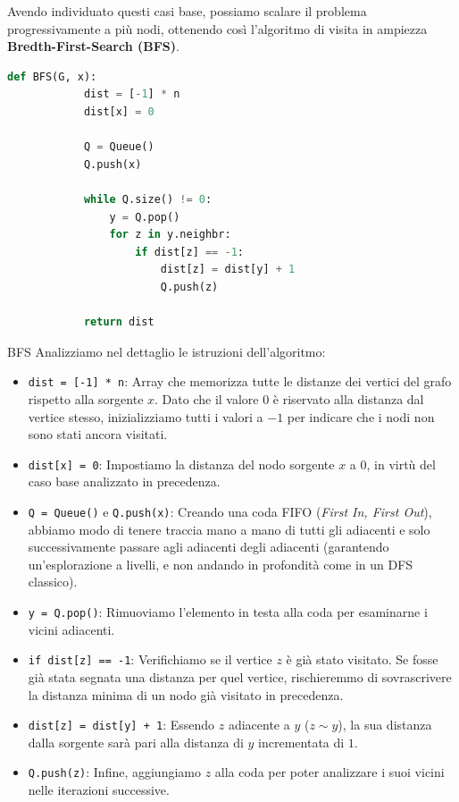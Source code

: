 \documentclass[12pt]{report}
\begin{document}
	Avendo individuato questi casi base, possiamo scalare il problema progressivamente a più nodi, ottenendo così l'algoritmo di visita in ampiezza \textbf{Bredth-First-Search (BFS)}.
	
	\begin{lstlisting}[language=Python, caption={Algoritmo BFS per il calcolo delle distanze da un nodo sorgente}]
		def BFS(G, x):
			dist = [-1] * n
			dist[x] = 0
			
			Q = Queue()
			Q.push(x)
			
			while Q.size() != 0:
				y = Q.pop()
				for z in y.neighbr:
					if dist[z] == -1:
						dist[z] = dist[y] + 1
						Q.push(z)
			
			return dist
	\end{lstlisting}
	
	\begin{algoritmo}{BFS}{}
		Analizziamo nel dettaglio le istruzioni dell'algoritmo:
		\begin{itemize}
			\item \texttt{dist = [-1] * n}: Array che memorizza tutte le distanze dei vertici del grafo rispetto alla sorgente $x$. Dato che il valore $0$ è riservato alla distanza dal vertice stesso, inizializziamo tutti i valori a $-1$ per indicare che i nodi non sono stati ancora visitati.
			
			\item \texttt{dist[x] = 0}: Impostiamo la distanza del nodo sorgente $x$ a $0$, in virtù del caso base analizzato in precedenza.
			
			\item \texttt{Q = Queue()} e \texttt{Q.push(x)}: Creando una coda FIFO (\emph{First In, First Out}), abbiamo modo di tenere traccia mano a mano di tutti gli adiacenti e solo successivamente passare agli adiacenti degli adiacenti (garantendo un'esplorazione a livelli, e non andando in profondità come in un DFS classico).
			
			\item \texttt{y = Q.pop()}: Rimuoviamo l'elemento in testa alla coda per esaminarne i vicini adiacenti.
			
			\item \texttt{if dist[z] == -1}: Verifichiamo se il vertice $z$ è già stato visitato. Se fosse già stata segnata una distanza per quel vertice, rischieremmo di sovrascrivere la distanza minima di un nodo già visitato in precedenza.
			
			\item \texttt{dist[z] = dist[y] + 1}: Essendo $z$ adiacente a $y$ ($z \sim y$), la sua distanza dalla sorgente sarà pari alla distanza di $y$ incrementata di $1$.
			
			\item \texttt{Q.push(z)}: Infine, aggiungiamo $z$ alla coda per poter analizzare i suoi vicini nelle iterazioni successive.
		\end{itemize}
	\end{algoritmo}
	
\end{document}

